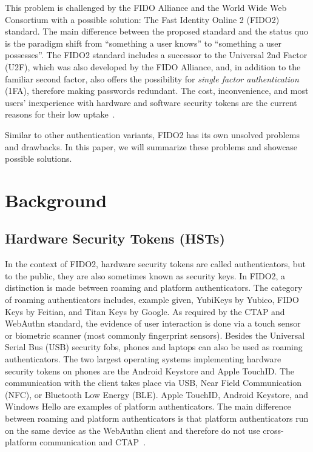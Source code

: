 \documentclass[runningheads]{llncs}
\begin{document}
This problem is challenged by the FIDO Alliance and the World Wide Web Consortium with a possible solution: The Fast Identity Online 2 (FIDO2) standard. The main difference between the proposed standard and the status quo is the paradigm shift from ``something a user knows'' to ``something a user possesses''. The FIDO2 standard includes a successor to the Universal 2nd Factor (U2F), which was also developed by the FIDO Alliance, and, in addition to the familiar second factor, also offers the possibility for \textit{single factor authentication} (1FA), therefore making passwords redundant. The cost, inconvenience, and most users' inexperience with hardware and software security tokens are the current reasons for their low uptake~\cite{274547,9152694}.

Similar to other authentication variants, FIDO2 has its own unsolved problems and drawbacks. In this paper, we will summarize these problems and showcase possible solutions. 

\section{Background}
\subsection{Hardware Security Tokens (HSTs)}
In the context of FIDO2, hardware security tokens are called authenticators, but to the public, they are also sometimes known as security keys. In FIDO2, a distinction is made between roaming and platform authenticators. The category of roaming authenticators includes, example given, YubiKeys by Yubico, FIDO Keys by Feitian, and Titan Keys by Google. As required by the CTAP and WebAuthn standard, the evidence of user interaction is done via a touch sensor or biometric scanner (most commonly fingerprint sensors). Besides the Universal Serial Bus (USB) security fobs, phones and laptops can also be used as roaming authenticators. The two largest operating systems implementing hardware security tokens on phones are the Android Keystore and Apple TouchID. The communication with the client takes place via USB, Near Field Communication (NFC), or Bluetooth Low Energy (BLE).
Apple TouchID, Android Keystore, and Windows Hello are examples of platform authenticators. The main difference between roaming and platform authenticators is that platform authenticators run on the same device as the WebAuthn client and therefore do not use cross-platform communication and CTAP~\cite{9152694}. 
\end{document}
